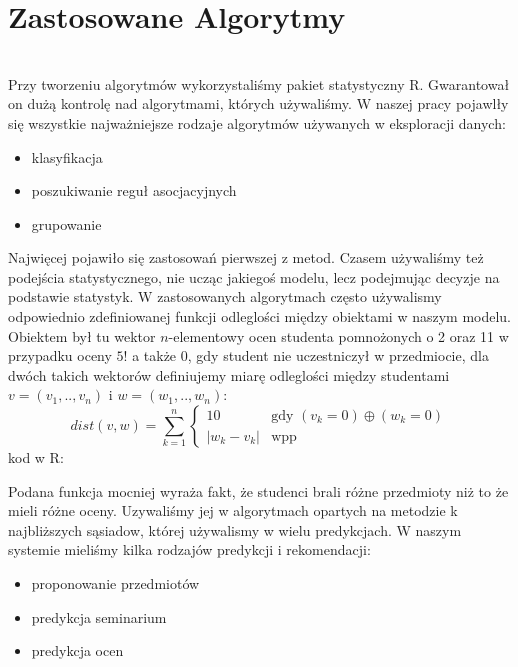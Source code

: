 \documentclass[licencjacka]{pracamgr}
\begin{document}
\chapter{Zastosowane Algorytmy}
~\\ \indent Przy tworzeniu algorytmów wykorzystaliśmy pakiet statystyczny R. Gwarantował on dużą kontrolę nad algorytmami,
których używaliśmy. W naszej pracy pojawlły się wszystkie najważniejsze rodzaje algorytmów używanych w eksploracji danych:
\begin{itemize}
 \item klasyfikacja
 \item poszukiwanie reguł asocjacyjnych
 \item grupowanie
\end{itemize}
Najwięcej pojawiło się zastosowań pierwszej z metod. Czasem używaliśmy też podejścia statystycznego, nie ucząc jakiegoś modelu,
lecz podejmując decyzje na podstawie statystyk. W zastosowanych algorytmach często używalismy odpowiednio zdefiniowanej
funkcji odleglości między obiektami w naszym modelu. Obiektem był tu wektor $n$-elementowy ocen studenta pomnożonych o 2 oraz 11
w przypadku oceny $5!$ a także $0$, gdy student nie uczestniczył w przedmiocie, dla dwóch takich wektorów definiujemy miarę 
odleglości między studentami $v=(v_{1},..,v_{n})$ i $w=(w_{1},..,w_{n})$:
\[
 dist(v,w) = \sum_{k=1}^n \begin{cases} 10 &\text{gdy } (v_{k} = 0)\oplus(w_{k} = 0) \\|w_{k}-v_{k}| &\text{wpp}  \end{cases}
\]
kod w R:

Podana funkcja mocniej wyraża fakt, że studenci brali różne przedmioty niż to że mieli różne oceny. Uzywaliśmy
jej w algorytmach opartych na metodzie k najbliższych sąsiadow, której używalismy w wielu predykcjach. W naszym systemie 
mieliśmy kilka rodzajów predykcji i rekomendacji:
\begin{itemize}
 \item proponowanie przedmiotów
 \item predykcja seminarium
 \item predykcja ocen
\end{itemize}
\end{document}
